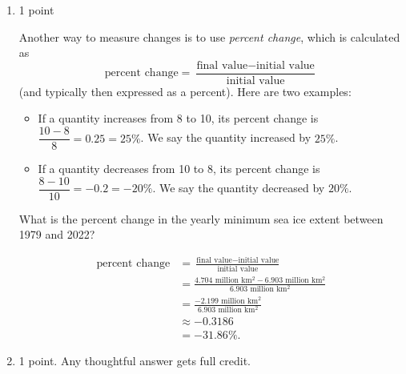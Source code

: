 \documentclass{article}
\begin{document}
\begin{enumerate}
\begin{enumerate}
    \begin{problem}[0.5in]
      Fill in the blank: Between 1979 and 2022, the yearly minimum sea ice extent decreased by  million km$^2$.
    \end{problem}

  \item \label{sea-ice-percent-change}

    \begin{grading}
      1 point
    \end{grading}

    \begin{problem}[\vfill]
      Another way to measure changes is to use \emph{percent change}, which is calculated as
      \[ \text{percent change} = \dfrac{\text{final value} - \text{initial value}}{\text{initial value}}\] (and typically then expressed as a percent). Here are two examples:
      \begin{itemize}
      \item If a quantity increases from 8 to 10, its percent change is $\dfrac{10 - 8}{8} = 0.25 = 25\%$. We say the quantity increased by $25\%$.

      \item If a quantity decreases from 10 to 8, its percent change is $\dfrac{8 - 10}{10} = -0.2 = -20\%$. We say the quantity decreased by $20\%$.
      \end{itemize}

      What is the percent change in the yearly minimum sea ice extent between 1979 and 2022?
    \end{problem}

    \begin{solution}
      \begin{align*}
        \text{percent change} &= \frac{\text{final value} - 
          \text{initial value}}{\text{initial value}} \\
        &= \frac{4.704 \text{ million km$^2$} - 6.903 \text{ million km$^2$}}
          {6.903 \text{ million km$^2$}} \\
        &= \frac{-2.199 \text{ million km$^2$}}{6.903 \text{ million km$^2$}} \\
        &\approx -0.3186 \\
        &= -31.86\%.
      \end{align*}
    \end{solution}

  \item

    \begin{grading}
      1 point. Any thoughtful answer gets full credit. 
    \end{grading}


\end{enumerate}
\end{enumerate}
\end{document}

